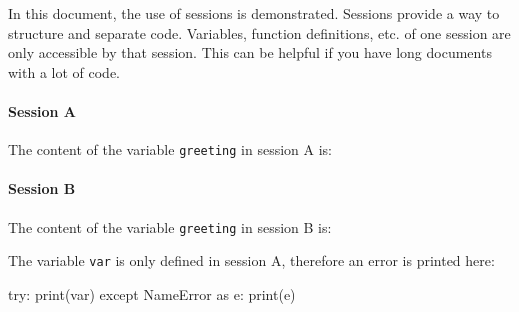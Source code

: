 \documentclass{article}
\begin{document}
In this document, the use of sessions is demonstrated.
Sessions provide a way to structure and separate code.
Variables, function definitions, etc. of one session are only accessible
by that session.
This can be helpful if you have long documents with a lot of code.

\paragraph{Session A}
The content of the variable \texttt{greeting} in session A is:\\

\paragraph{Session B}
The content of the variable \texttt{greeting} in session B is:\\

The variable \texttt{var} is only defined in session A, therefore
an error is printed here:
\begin{python}
try:
  print(var)
except NameError as e:
  print(e)
\end{python}
\end{document}

